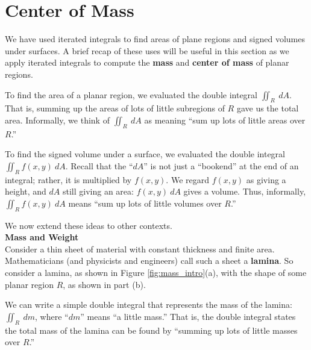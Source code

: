 \section{Center of Mass}\label{sec:center_of_mass}

We have used iterated integrals to find areas of plane regions and signed volumes under surfaces. A brief recap of these uses will be useful in this section as we apply iterated integrals to compute the \textbf{mass} and \textbf{center of mass} of planar regions.

To find the area of a planar region, we evaluated the double integral $\iint_R\ dA$. That is, summing up the areas of lots of little subregions of $R$ gave us the total area. Informally, we think of $\iint_R\ dA$ as meaning ``sum up lots of little areas over $R$.''

To find the signed volume under a surface, we evaluated the double integral $\iint_R f(x,y)\ dA$. Recall that the ``$dA$'' is not just a ``bookend'' at the end of an integral; rather, it is multiplied by $f(x,y)$. We regard $f(x,y)$ as giving a height, and $dA$ still giving an area: $f(x,y)\ dA$ gives a volume. Thus, informally, $\iint_Rf(x,y)\ dA$ means ``sum up lots of little volumes over $R$.''

We now extend these ideas to other contexts.\\

\noindent\textbf{\large Mass and Weight}\\

Consider a thin sheet of material with constant thickness and finite area. Mathematicians (and physicists and engineers) call such a sheet a \textbf{lamina}. So consider a lamina, as shown in Figure \ref{fig:mass_intro}(a),  with the shape of some planar region $R$, as shown in part (b).

We can write a simple double integral that represents the mass of the lamina: $\iint_R\ dm$, where ``$dm$'' means ``a little mass.'' That is, the double integral states the total mass of the lamina can be found by ``summing up lots of little masses over $R$.''

